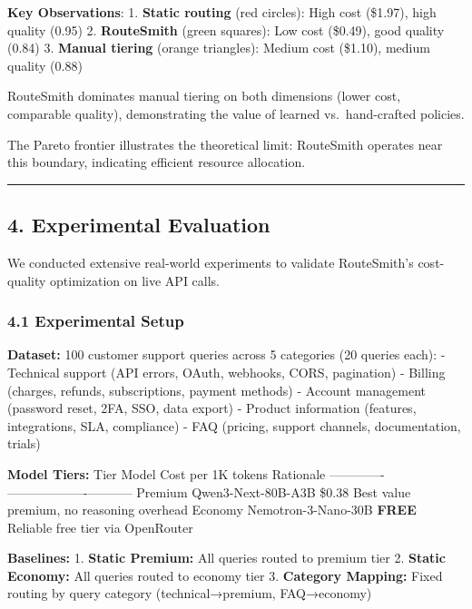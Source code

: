 \documentclass[
]{article}
\begin{document}
\textbf{Key Observations}: 1. \textbf{Static routing} (red circles):
High cost (\$1.97), high quality (0.95) 2. \textbf{RouteSmith} (green
squares): Low cost (\$0.49), good quality (0.84) 3. \textbf{Manual
tiering} (orange triangles): Medium cost (\$1.10), medium quality (0.88)

RouteSmith dominates manual tiering on both dimensions (lower cost,
comparable quality), demonstrating the value of learned vs.~hand-crafted
policies.

The Pareto frontier illustrates the theoretical limit: RouteSmith
operates near this boundary, indicating efficient resource allocation.

\begin{center}\rule{0.5\linewidth}{0.5pt}\end{center}

\hypertarget{experimental-evaluation}{%
\subsection{4. Experimental Evaluation}\label{experimental-evaluation}}

We conducted extensive real-world experiments to validate RouteSmith's
cost-quality optimization on live API calls.

\hypertarget{experimental-setup-1}{%
\subsubsection{4.1 Experimental Setup}\label{experimental-setup-1}}

\textbf{Dataset:} 100 customer support queries across 5 categories (20
queries each): - Technical support (API errors, OAuth, webhooks, CORS,
pagination) - Billing (charges, refunds, subscriptions, payment methods)
- Account management (password reset, 2FA, SSO, data export) - Product
information (features, integrations, SLA, compliance) - FAQ (pricing,
support channels, documentation, trials)

\textbf{Model Tiers:} \textbar{} Tier \textbar{} Model \textbar{} Cost
per 1K tokens \textbar{} Rationale \textbar{}
\textbar------\textbar-------\textbar-------------------\textbar-----------\textbar{}
\textbar{} Premium \textbar{} Qwen3-Next-80B-A3B \textbar{} \$0.38
\textbar{} Best value premium, no reasoning overhead \textbar{}
\textbar{} Economy \textbar{} Nemotron-3-Nano-30B \textbar{}
\textbf{FREE} \textbar{} Reliable free tier via OpenRouter \textbar{}

\textbf{Baselines:} 1. \textbf{Static Premium:} All queries routed to
premium tier 2. \textbf{Static Economy:} All queries routed to economy
tier 3. \textbf{Category Mapping:} Fixed routing by query category
(technical→premium, FAQ→economy)
\end{document}
